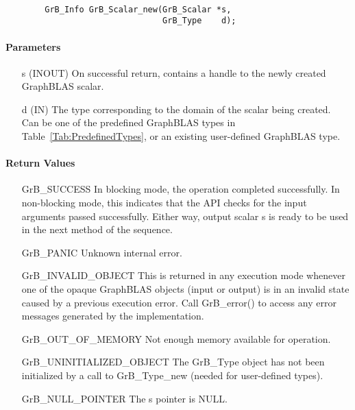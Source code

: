 \paragraph{\syntax}

\begin{verbatim}
        GrB_Info GrB_Scalar_new(GrB_Scalar *s,
                                GrB_Type    d);
\end{verbatim}

\paragraph{Parameters}

\begin{itemize}[leftmargin=1.1in]
    \item[{\sf s}] ({\sf INOUT}) On successful return, contains a handle
                                 to the newly created GraphBLAS scalar.
    \item[{\sf d}] ({\sf IN})    The type corresponding to the domain of the 
                                 scalar being created.  Can be one of the 
                                 predefined GraphBLAS types in 
                                 Table~\ref{Tab:PredefinedTypes}, or an existing 
                                 user-defined GraphBLAS type.
\end{itemize}

\paragraph{Return Values}

\begin{itemize}[leftmargin=2.1in]
    \item[{\sf GrB\_SUCCESS}]         In blocking mode, the operation completed
    successfully. In non-blocking mode, this indicates that the API checks 
    for the input arguments passed successfully. Either way, output scalar 
    {\sf s} is ready to be used in the next method of the sequence.

    \item[{\sf GrB\_PANIC}]           Unknown internal error.
    
    \item[{\sf GrB\_INVALID\_OBJECT}] This is returned in any execution mode 
    whenever one of the opaque GraphBLAS objects (input or output) is in an invalid 
    state caused by a previous execution error.  Call {\sf GrB\_error()} to access 
    any error messages generated by the implementation.

    \item[{\sf GrB\_OUT\_OF\_MEMORY}] Not enough memory available for operation.
    
    \item[{\sf GrB\_UNINITIALIZED\_OBJECT}]  The {\sf GrB\_Type} object has not 
    been initialized by a call to {\sf GrB\_Type\_new} (needed for user-defined types).
    
    \item[{\sf GrB\_NULL\_POINTER}]  The {\sf s} pointer is {\sf NULL}.
\end{itemize}

